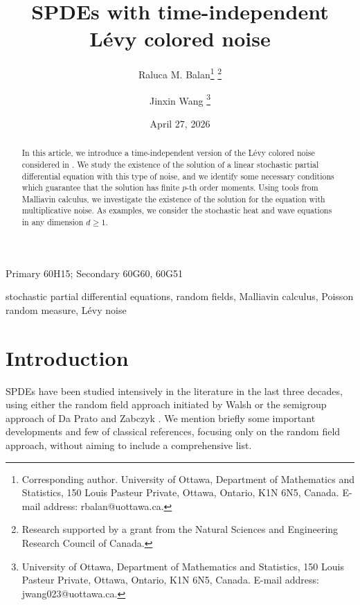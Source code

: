 \documentclass[12pt]{article}
\begin{document}
\title{SPDEs with time-independent\\
L\'evy colored noise}

\author{Raluca M. Balan\footnote{Corresponding author. University of Ottawa, Department of Mathematics and Statistics, 150 Louis Pasteur Private, Ottawa, Ontario, K1N 6N5, Canada. E-mail address: rbalan@uottawa.ca.} \footnote{Research supported by a grant from the Natural Sciences and Engineering Research Council of Canada.}
\and
Jinxin Wang \footnote{University of Ottawa, Department of Mathematics and Statistics, 150 Louis Pasteur Private, Ottawa, Ontario, K1N 6N5, Canada. E-mail address: jwang023@uottawa.ca.}
}

\date{April 27, 2026}
\maketitle


\begin{abstract}
\noindent
 In this article, we introduce a time-independent version of the L\'evy colored noise considered in \cite{B15,BJ26}. We study the existence of the solution of a linear stochastic partial differential equation with this type of noise, and we identify some necessary conditions which guarantee that the solution has finite $p$-th order moments. Using tools from Malliavin calculus, we investigate the existence of the solution for the equation with multiplicative noise. As examples, we consider the stochastic heat and wave equations in any dimension $d \geq 1$.
\end{abstract}




 Primary 60H15; Secondary 60G60, 60G51

\vspace{1mm}

 stochastic partial differential equations, random fields, Malliavin calculus, Poisson random measure, L\'evy noise

\pagebreak





\section{Introduction}

SPDEs have been studied intensively in the literature in the last three decades, using either the random field approach initiated by Walsh \cite{walsh86} or the semigroup approach of Da Prato and Zabczyk \cite{DZ92}. We mention briefly some important developments and few of classical references, focusing only on the random field approach, without aiming to include a comprehensive list. 
\end{document}
